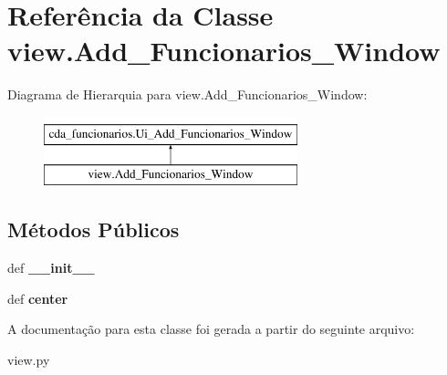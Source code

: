 \hypertarget{classview_1_1Add__Funcionarios__Window}{\section{\-Referência da \-Classe view.\-Add\-\_\-\-Funcionarios\-\_\-\-Window}
\label{classview_1_1Add__Funcionarios__Window}
}
\-Diagrama de \-Hierarquia para view.\-Add\-\_\-\-Funcionarios\-\_\-\-Window\-:\begin{figure}[H]
\begin{center}
\leavevmode
\includegraphics[height=2.000000cm]{classview_1_1Add__Funcionarios__Window}
\end{center}
\end{figure}
\subsection*{\-Métodos \-Públicos}
\begin{DoxyCompactItemize}
\item 
\hypertarget{classview_1_1Add__Funcionarios__Window_a3a6db2ca507b6380031e18a855f2d55f}{def {\bfseries \-\_\-\-\_\-init\-\_\-\-\_\-}}\label{classview_1_1Add__Funcionarios__Window_a3a6db2ca507b6380031e18a855f2d55f}

\item 
\hypertarget{classview_1_1Add__Funcionarios__Window_aae6289181eb577e5add8d8826d1a44c4}{def {\bfseries center}}\label{classview_1_1Add__Funcionarios__Window_aae6289181eb577e5add8d8826d1a44c4}

\end{DoxyCompactItemize}


\-A documentação para esta classe foi gerada a partir do seguinte arquivo\-:\begin{DoxyCompactItemize}
\item 
view.\-py\end{DoxyCompactItemize}
